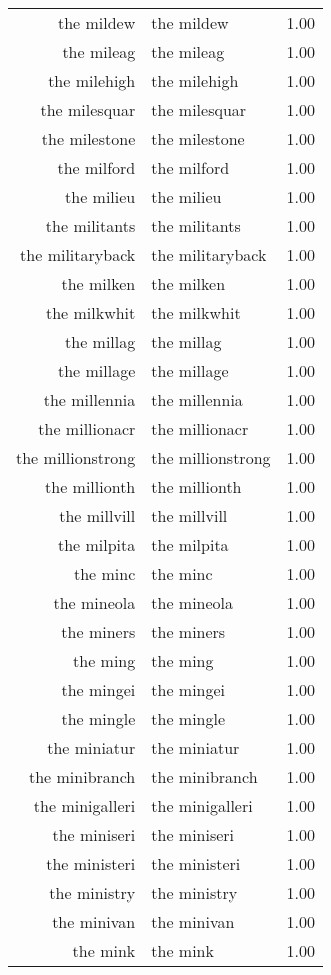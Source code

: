 \begin{table}[ht]
\begin{tabular}{rlr}
  the mildew & the mildew & 1.00 \\ 
  the mileag & the mileag & 1.00 \\ 
  the milehigh & the milehigh & 1.00 \\ 
  the milesquar & the milesquar & 1.00 \\ 
  the milestone & the milestone & 1.00 \\ 
  the milford & the milford & 1.00 \\ 
  the milieu & the milieu & 1.00 \\ 
  the militants & the militants & 1.00 \\ 
  the militaryback & the militaryback & 1.00 \\ 
  the milken & the milken & 1.00 \\ 
  the milkwhit & the milkwhit & 1.00 \\ 
  the millag & the millag & 1.00 \\ 
  the millage & the millage & 1.00 \\ 
  the millennia & the millennia & 1.00 \\ 
  the millionacr & the millionacr & 1.00 \\ 
  the millionstrong & the millionstrong & 1.00 \\ 
  the millionth & the millionth & 1.00 \\ 
  the millvill & the millvill & 1.00 \\ 
  the milpita & the milpita & 1.00 \\ 
  the minc & the minc & 1.00 \\ 
  the mineola & the mineola & 1.00 \\ 
  the miners & the miners & 1.00 \\ 
  the ming & the ming & 1.00 \\ 
  the mingei & the mingei & 1.00 \\ 
  the mingle & the mingle & 1.00 \\ 
  the miniatur & the miniatur & 1.00 \\ 
  the minibranch & the minibranch & 1.00 \\ 
  the minigalleri & the minigalleri & 1.00 \\ 
  the miniseri & the miniseri & 1.00 \\ 
  the ministeri & the ministeri & 1.00 \\ 
  the ministry & the ministry & 1.00 \\ 
  the minivan & the minivan & 1.00 \\ 
  the mink & the mink & 1.00 \\ 

\end{tabular}
\end{table}
